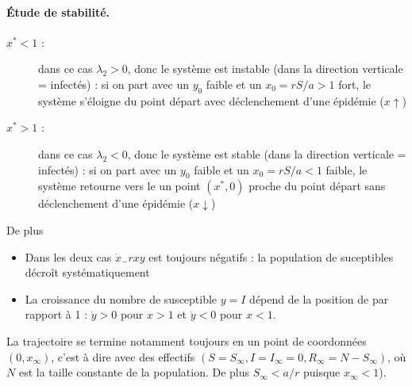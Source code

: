 \paragraph{\'Etude de stabilité.}
\begin{description}
  \item[$x^* < 1$ :] dans ce cas $\lambda_2 > 0$, donc le système est instable (dans la direction verticale = infectés) : si on part avec un $y_0$ faible et un $x_0 = rS/a > 1$ fort, le système s'éloigne du point départ avec déclenchement d'une épidémie ($x \uparrow$)
  \item[$x^* > 1$ :] dans ce cas $\lambda_2 < 0$, donc le système est stable (dans la direction verticale = infectés) : si on part avec un $y_0$ faible et un $x_0 = rS/a < 1$ faible, le système retourne vers le un point $(x^*, 0)$ proche du point départ sans déclenchement d'une épidémie ($x \downarrow$)
\end{description}


De plus
\begin{itemize}
  \item Dans les deux cas $\dot x _ -rxy$ est toujours négatifs : la population de suceptibles décroît systématiquement
  \item La croissance du nombre de susceptible $y = I$ dépend de la position de par rapport à 1 : $\dot y > 0$ pour $x > 1$ et $\dot y < 0$ pour $x < 1$.
\end{itemize}
La trajectoire se termine notamment toujours en un point de coordonnées $(0, x_\infty)$, c'est à dire avec des effectifs $(S = S_\infty, I = I_\infty = 0, R_\infty = N - S_\infty)$, où $N$ est la taille constante de la population. De plus $S_\infty < a/r$ puisque $x_\infty < 1$).


